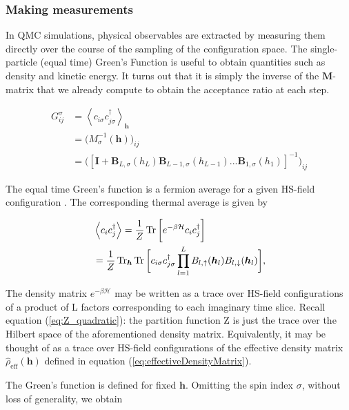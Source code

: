 \subsubsection{Making measurements}

In QMC simulations, physical observables are extracted by measuring them directly over the course of the sampling of the  configuration space. The single-particle (equal time) Green's Function is useful to obtain quantities such as density and kinetic energy. It turns out that it is simply the inverse of the $\bm M$-matrix that we already compute to obtain the acceptance ratio at each step.

\begin{equation}
\begin{split}
G_{ij}^\sigma &= \left\langle c_{i\sigma} c_{j\sigma}^\dagger \right\rangle_{\bm h} \\
&= \bigg( M_\sigma^{-1} (\bm h) \bigg)_{ij} \\
&= \bigg( [\bm I + \bm B_{L,\sigma} ( h_L ) \bm B_{L-1,\sigma} ( h_{L-1} ) ... \bm B_{1,\sigma} ( h_1 ) ]^{-1} \bigg)_{ij}
\end{split}
\end{equation}

The equal time Green's function is a fermion average for a given HS-field configuration \cite{santos_introduction_2003}. The corresponding thermal average is given by

\begin{equation}
\begin{split}
&\left\langle c_i c_j^\dagger \right\rangle = \frac{1}{Z} \operatorname{Tr} \bigg[ e^{-\beta \mathcal{H}} c_i c_j^\dagger \bigg] \\
&= \frac{1}{Z} \operatorname{Tr}_{\bm h} \operatorname{Tr} \bigg[ c_{i\sigma} c_{j\sigma}^\dagger \prod_{l=1}^L  B_{l, \uparrow}(\bm h_l) 
B_{l, \downarrow}(\bm h_l) \bigg],
\end{split}
\end{equation}

The density matrix $e^{-\beta\mathcal{H} }$ may be written as a trace over HS-field configurations of a product of L factors corresponding to each imaginary time slice. Recall equation (\ref{eq:Z_quadratic}): the partition function Z is just the trace over the Hilbert space of the aforementioned density matrix. Equivalently, it may be thought of as a trace over HS-field configurations of the effective density matrix $\hat{\rho}_{\text{eff}}(\bm h)$ defined in equation (\ref{eq:effectiveDensityMatrix}).

The Green's function is defined for fixed $\bm h$. Omitting the spin index $\sigma$, without loss of generality, we obtain 

